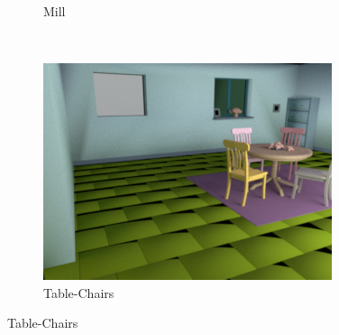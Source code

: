 \documentclass{jov}
\begin{document}
\begin{figure}[t]
\begin{subfigure}[b]{0.22 \textwidth}
        \caption{Mill}
        \label{fig:baseSceneMill}
    \end{subfigure}    
    ~
    \begin{subfigure}[b]{0.22 \textwidth}
        \includegraphics[width=\textwidth]{../Figures/Figure3/Figure3_c.png}
        \caption{Table-Chairs}
        \label{fig:baseSceneTableChairs}
    \end{subfigure}
    

\end{figure}
\end{document}
